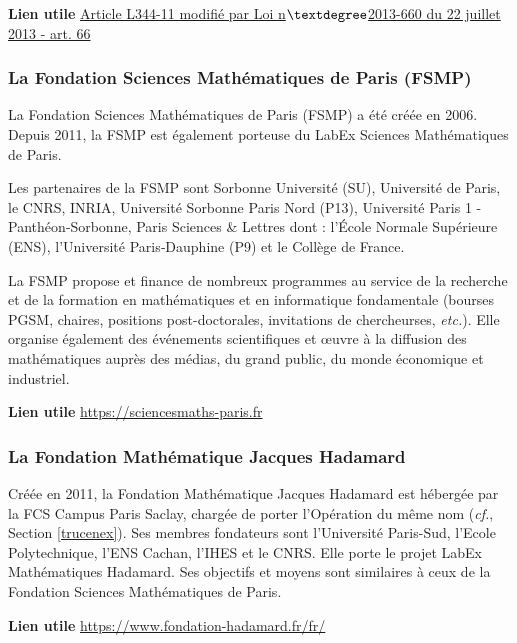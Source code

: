 \textbf{Lien utile\hspace{.5em}}
\href{hhttps://www.legifrance.gouv.fr/codes/id/LEGISCTA000027748290}{Article L344-11 modifi\'e par Loi n$\textdegree$2013-660 du 22 juillet 2013 - art. 66}

\subsubsection{La Fondation Sciences Math\'ematiques de Paris (FSMP)}

La Fondation Sciences Math\'ematiques de Paris (FSMP) a \'et\'e cr\'e\'ee en 2006. Depuis 2011, la FSMP est \'egalement porteuse du LabEx Sciences Math\'ematiques de Paris. 

Les partenaires de la FSMP sont Sorbonne Universit\'e (SU), Universit\'e de Paris, le CNRS, INRIA, Universit\'e Sorbonne Paris Nord (P13), Universit\'e Paris 1 - Panth\'eon‑Sorbonne, Paris Sciences \& Lettres dont : l'\'Ecole Normale Sup\'erieure (ENS), l'Universit\'e Paris‑Dauphine (P9) et le Coll\`ege de France.

La FSMP propose et finance de nombreux programmes au service de la recherche et de la formation en math\'ematiques et en informatique fondamentale (bourses PGSM, chaires, positions post-doctorales,  invitations de chercheur\mp se\mp s, {\em etc.}). Elle organise \'egalement des \'ev\'enements scientifiques et {\oe}uvre \`a la diffusion des math\'ematiques aupr\`es des m\'edias, du grand public, du monde \'economique et industriel.

\textbf{Lien utile\hspace{.5em}}
\url{https://sciencesmaths-paris.fr}

\subsubsection{La Fondation Math\'ematique Jacques Hadamard}

Cr\'e\'ee en 2011, la Fondation Math\'ematique Jacques Hadamard est h\'eberg\'ee par la FCS Campus Paris Saclay, charg\'ee de porter l'Op\'eration du m\^eme nom ({\em cf.}, Section \ref{trucenex}).
Ses membres fondateurs sont l'Universit\'e Paris-Sud, l'Ecole Polytechnique, l'ENS Cachan, l'IHES et le CNRS. Elle porte le projet LabEx Math\'ematiques Hadamard. Ses objectifs
et moyens sont similaires \`a ceux de la Fondation Sciences Math\'ematiques de Paris.

\textbf{Lien utile\hspace{.5em}}
\url{https://www.fondation-hadamard.fr/fr/}